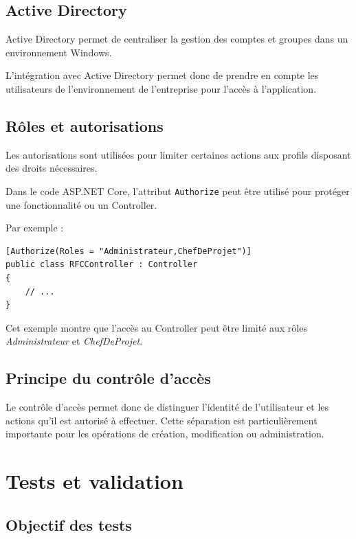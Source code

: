 \documentclass[12pt,a4paper,oneside]{report}
\begin{document}
\section{Active Directory}

Active Directory permet de centraliser la gestion des comptes et groupes dans un environnement Windows.

L'intégration avec Active Directory permet donc de prendre en compte les utilisateurs de l'environnement de l'entreprise pour l'accès à l'application.

\section{Rôles et autorisations}

Les autorisations sont utilisées pour limiter certaines actions aux profils disposant des droits nécessaires.

Dans le code ASP.NET Core, l'attribut \texttt{Authorize} peut être utilisé pour protéger une fonctionnalité ou un Controller.

Par exemple :

\begin{lstlisting}[language={[Sharp]C}]
[Authorize(Roles = "Administrateur,ChefDeProjet")]
public class RFCController : Controller
{
    // ...
}
\end{lstlisting}

Cet exemple montre que l'accès au Controller peut être limité aux rôles \textit{Administrateur} et \textit{ChefDeProjet}.

\section{Principe du contrôle d'accès}

Le contrôle d'accès permet donc de distinguer l'identité de l'utilisateur et les actions qu'il est autorisé à effectuer. Cette séparation est particulièrement importante pour les opérations de création, modification ou administration.

\chapter{Tests et validation}

\section{Objectif des tests}
\end{document}
